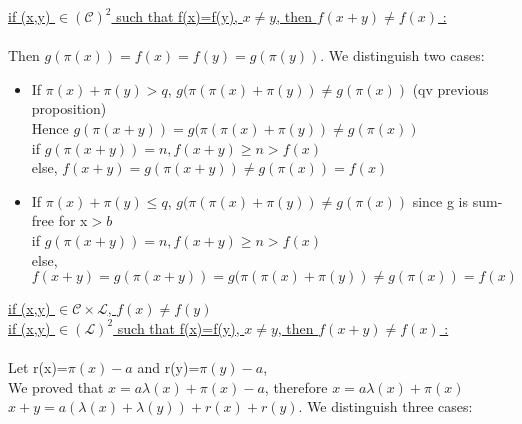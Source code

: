 \underline{if (x,y) \(\in (\mathcal{C})^2\) such that f(x)=f(y), \(x \neq y\), then \(f(x+y)\neq f(x)\)  :}\\
\\Then  \(g(\pi(x))=f(x)=f(y)=g(\pi(y))\). We distinguish two cases:

\begin{itemize}
\item If \(\pi(x)+\pi(y)>q\), \(g(\pi(\pi(x)+\pi(y)) \neq g(\pi(x))\) (qv previous proposition)
\\Hence \(g(\pi(x+y))= g(\pi(\pi(x)+\pi(y))\neq g(\pi(x))\)
\\if \(g(\pi(x+y))=n, f(x+y)\geqslant n > f(x)\)
\\else, \(f(x+y)=g(\pi(x+y))\neq g(\pi(x))=f(x)\)
\item If  \(\pi(x)+\pi(y)\leqslant q\), \(g(\pi(\pi(x)+\pi(y)) \neq g(\pi(x))\) since g is sum-free for x\(>b\)
\\if \(g(\pi(x+y))=n, f(x+y)\geqslant n > f(x)\)
\\else, \(f(x+y)=g(\pi(x+y))=g(\pi(\pi(x)+\pi(y))\neq g(\pi(x))=f(x)\)


\end{itemize}



\underline{if (x,y) \(\in \mathcal{C} \times \mathcal{L} \), \(f(x)\neq f(y)\)}\\

\underline{if (x,y) \(\in (\mathcal{L})^2\) such that f(x)=f(y), \(x \neq y\), then \(f(x+y)\neq f(x)\)  :}\\
\\Let r(x)=\(\pi(x)-a\) and r(y)=\(\pi(y)-a\),
\\We proved that \(x=a\lambda(x)+\pi(x)-a\), therefore \(x=a\lambda(x)+\pi(x)\)
\\\(x+y=a(\lambda(x)+\lambda(y))+r(x)+r(y)\). We distinguish three cases:

